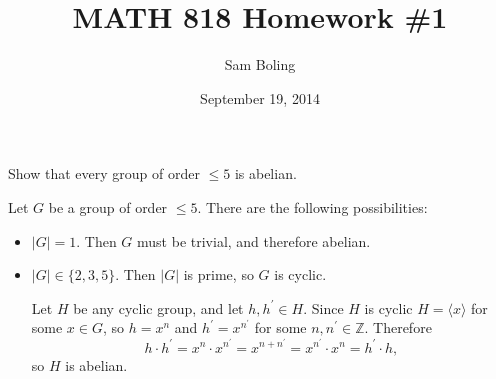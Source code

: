 \documentclass{article}
\title{MATH 818 Homework \#1}
\date{September 19, 2014}
\author{Sam Boling}
\newcounter{Problem}
\newenvironment{Problem}{\begin{Exercise}[name={Problem},
                                          counter={Problem}]}
                        {\end{Exercise}}
\begin{document}
\begin{titlepage}
\maketitle
\end{titlepage}

\begin{Problem}
Show that every group of order $\leq 5$ is abelian.
\end{Problem}

\begin{Answer}
Let $G$ be a group of order $\leq 5$. There are the following possibilities:
\begin{itemize}
  \item{$|G| = 1$. Then $G$ must be trivial, and therefore abelian.}
  \item{$|G| \in \{2, 3, 5\}$. Then $|G|$ is prime, so $G$ is cyclic.

        Let $H$ be any cyclic group, and let $h, h^\prime \in
        H$. Since $H$ is cyclic $H = \langle x \rangle$ for some $x
        \in G$, so $h = x^n$ and $h^\prime =
        x^{n^\prime}$ for some $n, n^\prime \in \mathbb{Z}$. Therefore
        $$
        h \cdot h^\prime
      = x^n \cdot x^{n^\prime}
      = x^{n + n^\prime}
      = x^{n^\prime} \cdot x^{n}
      = h^\prime \cdot h,
        $$
        so $H$ is abelian.

}
\end{itemize}
\end{Answer}
\end{document}
